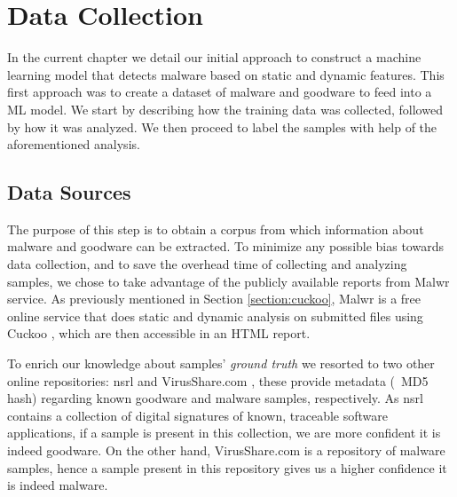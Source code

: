 
\chapter{Data Collection}
\label{chapter:data_collection}

In the current chapter we detail our initial approach to construct a machine learning model that detects malware based on static and dynamic features.
This first approach was to create a dataset of malware and goodware to feed into a ML model.
We start by describing how the training data was collected, followed by how it was analyzed.
We then proceed to label the samples with help of the aforementioned analysis.

\section{Data Sources}
\label{section:data_sources}

The purpose of this step is to obtain a corpus from which information
about malware and goodware can be extracted.
To minimize any possible bias towards data collection, and to save the overhead time of collecting and analyzing samples, we chose to take advantage of the publicly available reports from Malwr \cite{tool:malwr} service.
As previously mentioned in Section \ref{section:cuckoo}, Malwr is a free online service that does static and dynamic analysis on submitted files using Cuckoo \cite{tool:cuckoo}, which are then accessible in an HTML report.

To enrich our knowledge about samples' \textit{ground truth} we resorted to two other online repositories: \gls{nsrl} \cite{tool:nsrl} and VirusShare.com \cite{tool:virusshare}, these provide metadata (\eg\ MD5 hash) regarding known goodware and malware samples, respectively.
As \gls{nsrl} contains a collection of digital signatures of known, traceable software applications, if a sample is present in this collection, we are more confident it is indeed goodware.
On the other hand, VirusShare.com is a repository of malware samples, hence a sample present in this repository gives us a higher confidence it is indeed malware.

